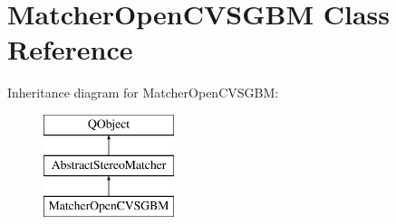 \hypertarget{class_matcher_open_c_v_s_g_b_m}{}\section{Matcher\+Open\+C\+V\+S\+G\+B\+M Class Reference}
\label{class_matcher_open_c_v_s_g_b_m}
Inheritance diagram for Matcher\+Open\+C\+V\+S\+G\+B\+M\+:\begin{figure}[H]
\begin{center}
\leavevmode
\includegraphics[height=3.000000cm]{class_matcher_open_c_v_s_g_b_m}
\end{center}
\end{figure}
